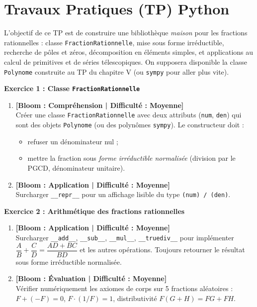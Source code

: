 \section*{Travaux Pratiques (TP) Python}

\vspace{0.3cm}
\noindent L'objectif de ce TP est de construire une bibliothèque \emph{maison} pour les fractions rationnelles : classe \texttt{FractionRationnelle}, mise sous forme irréductible, recherche de pôles et zéros, décomposition en éléments simples, et applications au calcul de primitives et de séries télescopiques. On supposera disponible la classe \texttt{Polynome} construite au TP du chapitre V (ou \texttt{sympy} pour aller plus vite).

\vspace{0.3cm}

\noindent\textbf{Exercice 1 : Classe \texttt{FractionRationnelle}}
\begin{enumerate}
    \item \textbf{[Bloom : Compréhension | Difficulté : Moyenne]} \\
    Créer une classe \texttt{FractionRationnelle} avec deux attributs (\texttt{num}, \texttt{den}) qui sont des objets \texttt{Polynome} (ou des polynômes \texttt{sympy}). Le constructeur doit :
    \begin{itemize}
        \item refuser un dénominateur nul ;
        \item mettre la fraction sous \emph{forme irréductible normalisée} (division par le PGCD, dénominateur unitaire).
    \end{itemize}
    \item \textbf{[Bloom : Application | Difficulté : Moyenne]} \\
    Surcharger \texttt{\_\_repr\_\_} pour un affichage lisible du type \texttt{(num) / (den)}.
\end{enumerate}

\vspace{0.3cm}

\noindent\textbf{Exercice 2 : Arithmétique des fractions rationnelles}
\begin{enumerate}
    \item \textbf{[Bloom : Application | Difficulté : Moyenne]} \\
    Surcharger \texttt{\_\_add\_\_}, \texttt{\_\_sub\_\_}, \texttt{\_\_mul\_\_}, \texttt{\_\_truediv\_\_} pour implémenter $\dfrac{A}{B} + \dfrac{C}{D} = \dfrac{AD + BC}{BD}$ et les autres opérations. Toujours retourner le résultat sous forme irréductible normalisée.
    \item \textbf{[Bloom : Évaluation | Difficulté : Moyenne]} \\
    Vérifier numériquement les axiomes de corps sur 5 fractions aléatoires : $F + (-F) = 0$, $F \cdot (1/F) = 1$, distributivité $F(G + H) = FG + FH$.
\end{enumerate}

